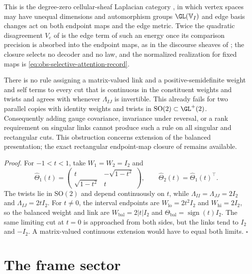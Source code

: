 This is the degree-zero cellular-sheaf Laplacian category \citep{HansenGhrist2019}, in which vertex spaces
may have unequal dimensions and automorphism groups $\GL(\mathbb V_I)$ and edge basis changes act on both endpoint
maps and the edge metric. Twice the quadratic disagreement $V_e$ of  is
the edge term of such an energy once its comparison precision is absorbed into the endpoint maps, as in
the discourse sheaves of \citet{HansenGhrist2021Discourse}; the closure selects no decoder and no law, and
the normalized realization for fixed maps is \eqref{eq:obs-selective-attention-record}.

There is no rule assigning a matrix-valued link and a positive-semidefinite weight and self terms to
every cut that is continuous in the constituent weights and twists and agrees with
 whenever $\Lambda_{IJ}$ is invertible. This already fails for two
parallel copies with identity weights and twists in $\mathrm{SO}(2)\subset\GL^+(2)$. Consequently adding
gauge covariance, invariance under reversal, or a rank requirement on singular links cannot produce such
a rule on all singular and rectangular cuts. This obstruction concerns extension of the balanced
presentation; the exact rectangular endpoint-map closure of 
remains available. 

\noindent\emph{Proof.}
For $-1<t<1$, take $W_1=W_2=I_2$ and
\begin{equation}
\widehat\Theta_1(t)=\begin{pmatrix}t&-\sqrt{1-t^2}\\\sqrt{1-t^2}&t\end{pmatrix},
\qquad \widehat\Theta_2(t)=\widehat\Theta_1(t)^\top.
\label{eq:cg-cut-continuous-extension-witness}
\end{equation}
The twists lie in $\mathrm{SO}(2)$ and depend continuously on $t$, while
$\Lambda_{II}=\Lambda_{JJ}=2I_2$ and $\Lambda_{IJ}=2tI_2$. For $t\neq0$, the interval endpoints are
$W_{\mathrm{lo}}=2t^2I_2$ and $W_{\mathrm{hi}}=2I_2$, so the balanced weight and link are
$W_{\mathrm{bal}}=2|t|I_2$ and $\Theta_{\mathrm{bal}}=\operatorname{sign}(t)I_2$.
The same limiting cut at $t=0$ is approached from both sides, but the links tend to $I_2$ and $-I_2$.
A matrix-valued continuous extension would have to equal both limits. $\square$

\section{The frame sector}
\label{sec:cg-frame}

